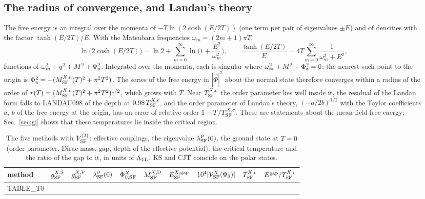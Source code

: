 \documentclass[aps,prd,onecolumn,superscriptaddress,nofootinbib,floatfix,longbibliography]{revtex4-2}
\newcommand{\LL}{{\rm LL}}
\newcommand{\SF}{{\rm SF}}
\begin{document}
\subsection{The radius of convergence, and Landau's theory}

The free energy is an integral over the momenta of $-T\ln(2\cosh(E/2T))$ (one term per pair of eigenvalues $\pm E$) and of
densities with the factor $\tanh(E/2T)/E$. With the Matsubara frequencies $\omega_m=(2m+1)\pi T$,
\begin{equation}
\ln\big(2\cosh(E/2T)\big)=\ln2+\sum_{m=0}^\infty\ln\Big(1+\frac{E^2}{\omega_m^2}\Big),\qquad\frac{\tanh(E/2T)}{E}=4T\sum_{m=0}^\infty\frac1{\omega_m^2+E^2},
\label{eq:matsubara}
\end{equation}
functions of $\omega_m^2+q^2+M^2+\Phi_{\rm a}^2$. Integrated over the momenta, each is singular where $\omega_m^2+M^2+\Phi_{\rm a}^2=0$; the
nearest such point to the origin is $\Phi_{\rm a}^2=-(M^{X,{\rm n}}_\SF(T)^2+\pi^2T^2)$. The series of the free energy in $|\vec\Phi|^2$ about the
normal state therefore converges within a radius of the order of $r(T)=(M^{X,{\rm n}}_\SF(T)^2+\pi^2T^2)^{1/2}$, which grows with $T$.
Near $T^{X,{\rm c}}_\SF$ the order parameter lies well inside it, the residual of the Landau form falls to {{LANDAU098}} of the depth
at $0.98\,T^{X,{\rm c}}_\SF$, and the order parameter of Landau's theory, $(-a/2b)^{1/2}$ with the Taylor coefficients $a$, $b$ of
the free energy at the origin, has an error of relative order $1-T/T^{X,{\rm c}}_\SF$. These are statements about the mean-field free
energy; Sec.~\ref{sec:gi} shows that these temperatures lie inside the critical region.

\begin{table}[h]
\caption{\label{tab:T0}The five methods with $V^{(2)}_\SF$: effective couplings, the eigenvalue $\lambda^{\rm P}_\SF(0)$, the ground state at
$T=0$ (order parameter, Dirac mass, gap, depth of the effective potential), the critical temperature and the ratio of the gap
to it, in units of $\Lambda_\LL$. KS and CJT coincide on the polar states.}
\begin{ruledtabular}
\begin{tabular}{lrrrrrrrrr}
method & $g^{X,{\rm S}}_\SF$ & $g^{X,{\rm P}}_\SF$ & $\lambda^{\rm P}_\SF(0)$ & $\Phi^X_{0,\SF}$ & $M^{X,{\rm D}}_\SF$ & $E^{X,{\rm gap}}_\SF$ & $10^4|\mathcal V^X_\SF(\Phi_0)|$ & $T^{X,{\rm c}}_\SF$ & $E^{\rm gap}/T^{X,{\rm c}}_\SF$ \\
\hline
{{TABLE_T0}}
\end{tabular}
\end{ruledtabular}
\end{table}
\end{document}
